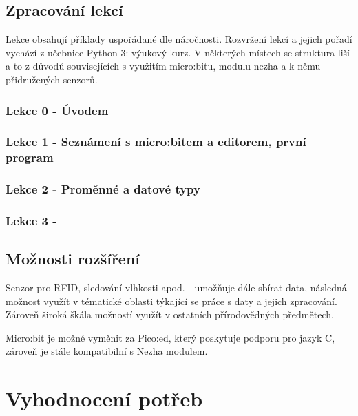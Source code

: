 \documentclass[
  digital,     %
  oneside,     %
  nosansbold,  %
  colorbold, %
  lof,         %
  nolot,         %
]{fithesis4}
\begin{document}
\section{Zpracování lekcí}

Lekce obsahují příklady uspořádané dle náročnosti. Rozvržení lekcí a jejich pořadí vychází z učebnice Python 3: výukový kurz. %
V některých místech se struktura liší a to z důvodů souvisejících s využitím micro:bitu, modulu nezha a k němu přidružených senzorů. 

\subsection{Lekce 0 - Úvodem} %


\subsection{Lekce 1 - Seznámení s micro:bitem a editorem, první program}

\subsection{Lekce 2 - Proměnné a datové typy}

\subsection{Lekce 3 - }

\section{Možnosti rozšíření}
Senzor pro RFID, sledování vlhkosti apod. - umožňuje dále sbírat data, následná možnost využít v tématické oblasti týkající se práce s daty a jejich zpracování. Zároveň široká škála možností využít v ostatních přírodovědných předmětech.

Micro:bit je možné vyměnit za Pico:ed, který poskytuje podporu pro jazyk C, zároveň je stále kompatibilní s Nezha modulem. 

\chapter{Vyhodnocení potřeb}
\end{document}
